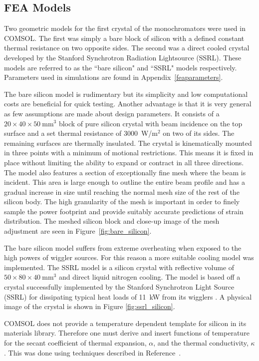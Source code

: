 \documentclass{iucr}
\begin{document}
\subsection{FEA Models}

Two geometric models for the first crystal of the monochromators were used in COMSOL. The first was simply a bare block of silicon with a defined constant thermal resistance on two opposite sides. The second was a direct cooled crystal developed by the Stanford Synchrotron Radiation Lightsource (SSRL). These models are referred to as the ``bare silicon" and ``SSRL" models respectively. Parameters used in simulations are found in Appendix~\ref{feaparameters}.

The bare silicon model is rudimentary but its simplicity and low computational costs are beneficial for quick testing. Another advantage is that it is very general as few assumptions are made about design parameters. It consists of a $20\times 40\times 50~$mm$^3$ block of pure silicon crystal with beam incidence on the top surface and a set thermal resistance of 3000~W/m$^2$ on two of its sides. The remaining surfaces are thermally insulated. The crystal is kinematically mounted in three points with a minimum of motional restrictions. This means it is fixed in place without limiting the ability to expand or contract in all three directions. The model also features a section of exceptionally fine mesh where the beam is incident. This area is large enough to outline the entire beam profile and has a gradual increase in size until reaching the normal mesh size of the rest of the silicon body. The high granularity of the mesh is important in order to finely sample the power footprint and provide suitably accurate predictions of strain distribution. The meshed silicon block and close-up image of the mesh adjustment are seen in Figure~\ref{fig:bare_silicon}.

The bare silicon model suffers from extreme overheating when exposed to the high powers of wiggler sources. For this reason a more suitable cooling model was implemented. The SSRL model is a silicon crystal with reflective volume of $50\times 80\times 40~$mm$^3$ and direct liquid nitrogen cooling. The model is based off a crystal successfully implemented by the Stanford Synchrotron Light Source (SSRL) for dissipating typical heat loads of 11~kW from its wigglers \cite{stanford}. A physical image of the crystal is shown in Figure \ref{fig:ssrl_silicon}.

COMSOL does not provide a temperature dependent template for silicon in its materials library. Therefore one must derive and insert functions of temperature for the secant coefficient of thermal expansion, $\alpha$, and the thermal conductivity, $\kappa$. This was done using techniques described in Reference~\cite{mash}.
\end{document}
